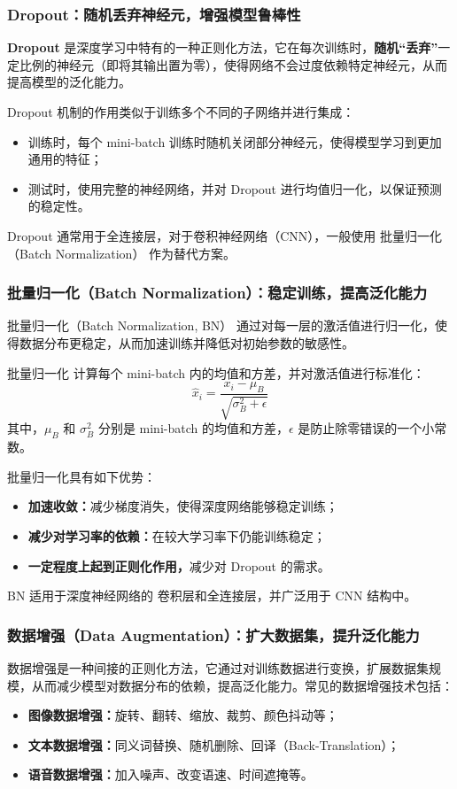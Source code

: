 \subsubsection*{Dropout：随机丢弃神经元，增强模型鲁棒性}
{\bf Dropout} 是深度学习中特有的一种正则化方法，它在每次训练时，{\bf 随机“丢弃”}一定比例的神经元（即将其输出置为零），使得网络不会过度依赖特定神经元，从而提高模型的泛化能力。

Dropout 机制的作用类似于训练多个不同的子网络并进行集成：
\begin{itemize}
\item {\bf  } 训练时，每个 mini-batch 训练时随机关闭部分神经元，使得模型学习到更加通用的特征；
\item {\bf  } 测试时，使用完整的神经网络，并对 Dropout 进行均值归一化，以保证预测的稳定性。
\end{itemize}
Dropout 通常用于全连接层，对于卷积神经网络（CNN），一般使用 批量归一化（Batch Normalization） 作为替代方案。

\subsubsection*{ 批量归一化（Batch Normalization）：稳定训练，提高泛化能力}
批量归一化（Batch Normalization, BN） 通过对每一层的激活值进行归一化，使得数据分布更稳定，从而加速训练并降低对初始参数的敏感性。

批量归一化 计算每个 mini-batch 内的均值和方差，并对激活值进行标准化：
  \[
  \hat{x}_i = \frac{x_i - \mu_B}{\sqrt{\sigma_B^2 + \epsilon}}
  \]
  其中，\(\mu_B\) 和 \(\sigma_B^2\) 分别是 mini-batch 的均值和方差，\(\epsilon\) 是防止除零错误的一个小常数。

批量归一化具有如下优势：
\begin{itemize}
\item {\bf   加速收敛：}减少梯度消失，使得深度网络能够稳定训练；
\item {\bf  减少对学习率的依赖：}在较大学习率下仍能训练稳定；
 \item {\bf  一定程度上起到正则化作用，}减少对 Dropout 的需求。
\end{itemize}
BN 适用于深度神经网络的 卷积层和全连接层，并广泛用于 CNN 结构中。

\subsubsection*{ 数据增强（Data Augmentation）：扩大数据集，提升泛化能力}
数据增强是一种间接的正则化方法，它通过对训练数据进行变换，扩展数据集规模，从而减少模型对数据分布的依赖，提高泛化能力。常见的数据增强技术包括：
\begin{itemize}
\item {\bf  图像数据增强：}旋转、翻转、缩放、裁剪、颜色抖动等；
\item {\bf  文本数据增强：}同义词替换、随机删除、回译（Back-Translation）；
\item {\bf  语音数据增强：}加入噪声、改变语速、时间遮掩等。
\end{itemize}

